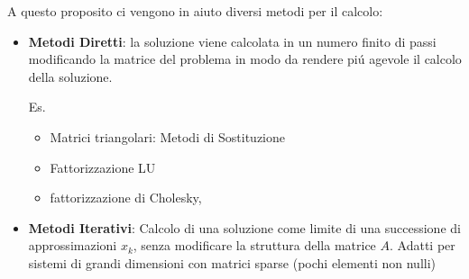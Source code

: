 A questo proposito ci vengono in aiuto diversi metodi per il calcolo:
\begin{itemize}
    \item \textbf{Metodi Diretti}: la soluzione viene calcolata in un numero finito di passi modificando la matrice del problema in modo da rendere piú agevole il calcolo della soluzione. 
    
    Es. 
    \begin{itemize}
        \item Matrici triangolari: Metodi di Sostituzione
        \item Fattorizzazione LU
        \item  fattorizzazione di Cholesky, 
    \end{itemize}

    \item \textbf{Metodi Iterativi}: Calcolo di una soluzione come limite di una successione di approssimazioni $x_k$, senza modificare la struttura della matrice $A$. Adatti per sistemi di grandi dimensioni con matrici sparse (pochi elementi non nulli)
\end{itemize}
